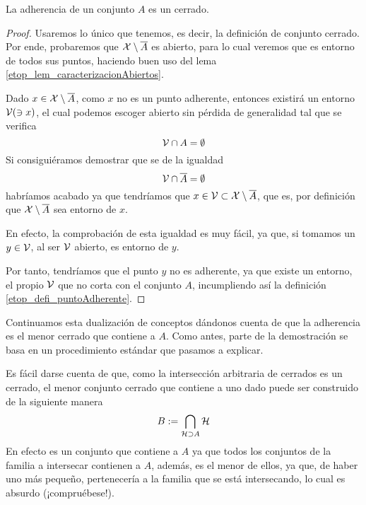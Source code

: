 \begin{lem}
	\label{etop_lem_clausuraAdherencia}
	La adherencia de un conjunto $A$ es un cerrado.
\end{lem}
\begin{proof}
	Usaremos lo único que tenemos, es decir, la definición de conjunto cerrado. Por ende, probaremos que $\mathcal{X}\setminus\overline{A}$ es abierto, para lo cual veremos que es entorno de todos sus puntos, haciendo buen uso del lema \ref{etop_lem_caracterizacionAbiertos}.
	
	Dado $x\in\mathcal{X}\setminus\overline{A}$, como $x$ no es un punto adherente, entonces existirá un entorno $\mathcal{V}(\ni x)$, el cual podemos escoger abierto sin pérdida de generalidad tal que se verifica
	\begin{equation*}
	\mathcal{V}\cap A=\emptyset
	\end{equation*}
	Si consiguiéramos demostrar que se de la igualdad
	\begin{equation*}
	\mathcal{V}\cap \overline{A}=\emptyset
	\end{equation*}
	habríamos acabado ya que tendríamos que $x\in\mathcal{V}\subset\mathcal{X}\setminus\overline{A}$, que es, por definición que $\mathcal{X}\setminus \overline{A}$ sea entorno de $x$.
	
	En efecto, la comprobación de esta igualdad es muy fácil, ya que, si tomamos un $y\in\mathcal{V}$, al ser $\mathcal{V}$ abierto, es entorno de $y$.
	
	Por tanto, tendríamos que el punto $y$ no es adherente, ya que existe un entorno, el propio $\mathcal{V}$ que no corta con el conjunto $A$, incumpliendo así la definición \ref{etop_defi_puntoAdherente}.
\end{proof}
Continuamos esta dualización de conceptos dándonos cuenta de que la adherencia es el menor cerrado que contiene a $A$. Como antes, parte de la demostración se basa en un procedimiento estándar que pasamos a explicar.

Es fácil darse cuenta de que, como la intersección arbitraria de cerrados es un cerrado, el menor conjunto cerrado que contiene a uno dado puede ser construido de la siguiente manera
\begin{equation}
\label{etop_eq_menorCerrado}
B:=\bigcap_{\mathcal{H}\supset A}\mathcal{H}
\end{equation}
En efecto es un conjunto que contiene a $A$ ya que todos los conjuntos de la familia a intersecar contienen a $A$, además, es el menor de ellos, ya que, de haber uno más pequeño, pertenecería a la familia que se está intersecando, lo cual es absurdo (¡compruébese!).

